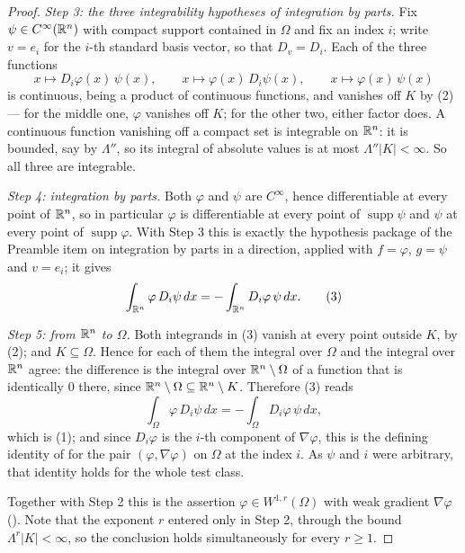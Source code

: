 \begin{proof}
\emph{Step 3: the three integrability hypotheses of integration by parts.}  Fix
$\psi\in C^\infty(\mathbb{R}^n)$ with compact support contained in $\Omega$ and fix an
index $i$; write $v=e_i$ for the $i$-th standard basis vector, so that
$D_v=D_i$.  Each of the three functions
\[
x\mapsto D_i\varphi(x)\,\psi(x),
\qquad
x\mapsto \varphi(x)\,D_i\psi(x),
\qquad
x\mapsto \varphi(x)\,\psi(x)
\]
is continuous, being a product of continuous functions, and vanishes off $K$ by
(2) --- for the middle one, $\varphi$ vanishes off $K$; for the other two,
either factor does.  A continuous function vanishing off a compact set is
integrable on $\mathbb{R}^n$: it is bounded, say by $\Lambda''$, so its integral of
absolute values is at most $\Lambda''|K|<\infty$.  So all three are integrable.

\emph{Step 4: integration by parts.}  Both $\varphi$ and $\psi$ are $C^\infty$,
hence differentiable at every point of $\mathbb{R}^n$, so in particular $\varphi$ is
differentiable at every point of $\operatorname{supp}\psi$ and $\psi$ at every
point of $\operatorname{supp}\varphi$.  With Step 3 this is exactly the
hypothesis package of the Preamble item on integration by parts in a direction,
applied with $f=\varphi$, $g=\psi$ and $v=e_i$; it gives
\[
\int_{\mathbb{R}^n}\varphi\,D_i\psi\,dx=-\int_{\mathbb{R}^n}D_i\varphi\,\psi\,dx .
\tag{3}
\]

\emph{Step 5: from $\mathbb{R}^n$ to $\Omega$.}  Both integrands in (3) vanish at every
point outside $K$, by (2); and $K\subseteq\Omega$.  Hence for each of them the
integral over $\Omega$ and the integral over $\mathbb{R}^n$ agree: the difference is the
integral over $\mathbb{R}^n\setminus\Omega$ of a function that is identically $0$ there,
since $\mathbb{R}^n\setminus\Omega\subseteq\mathbb{R}^n\setminus K$.  Therefore (3) reads
\[
\int_\Omega\varphi\,D_i\psi\,dx=-\int_\Omega D_i\varphi\,\psi\,dx ,
\]
which is (1); and since $D_i\varphi$ is the $i$-th component of
$\nabla\varphi$, this is the defining identity of
 for the pair $(\varphi,\nabla\varphi)$ on $\Omega$
at the index $i$.  As $\psi$ and $i$ were arbitrary, that identity holds for
the whole test class.

Together with Step 2 this is the assertion $\varphi\in W^{1,r}(\Omega)$ with
weak gradient $\nabla\varphi$ ().  Note that the exponent $r$
entered only in Step 2, through the bound $\Lambda^r|K|<\infty$, so the
conclusion holds simultaneously for every $r\ge1$.
\end{proof}
